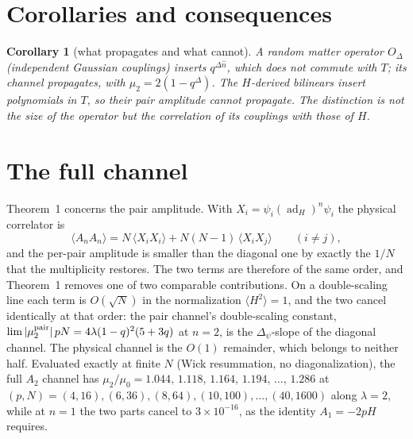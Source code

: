 \documentclass[11pt]{article}
\newtheorem{corollary}{Corollary}
\newcommand{\ad}{\operatorname{ad}}
\begin{document}
\section{Corollaries and consequences}

\begin{corollary}[what propagates and what cannot]
A random matter operator $O_\Delta$ (independent Gaussian couplings)
inserts $q^{\Delta\hat n}$, which does not commute with $T$; its channel
propagates, with $\mu_2=2(1-q^{\Delta})$. The $H$-derived bilinears insert
polynomials in $T$, so their pair amplitude cannot propagate. The
distinction is not the size of the operator but the correlation of its
couplings with those of $H$.
\end{corollary}

\section{The full channel}

Theorem~1 concerns the pair amplitude. With $X_i=\psi_i(\ad_H)^n\psi_i$
the physical correlator is
\begin{equation}
\langle A_nA_n\rangle=N\,\langle X_iX_i\rangle+N(N-1)\,\langle X_iX_j\rangle
\qquad(i\neq j),
\end{equation}
and the per-pair amplitude is smaller than the diagonal one by exactly
the $1/N$ that the multiplicity restores. The two terms are therefore of
the same order, and Theorem~1 removes one of two comparable
contributions. On a double-scaling line each term is $O(\sqrt N)$ in the
normalization $\langle H^2\rangle=1$, and the two cancel identically at
that order: the pair channel's double-scaling constant,
$\lim|\mu_2^{\rm pair}|\,pN=4\lambda(1-q)^2(5+3q)$ at $n=2$, is the
$\Delta_\psi$-slope of the diagonal channel. The physical channel is the
$O(1)$ remainder, which belongs to neither half. Evaluated exactly at
finite $N$ (Wick resummation, no diagonalization), the full $A_2$ channel
has $\mu_2/\mu_0=1.044,\,1.118,\,1.164,\,1.194,\,\dots,\,1.286$ at
$(p,N)=(4,16),(6,36),(8,64),(10,100),\dots,(40,1600)$ along
$\lambda=2$, while at $n=1$ the two parts cancel to $3\times10^{-16}$, as
the identity $A_1=-2pH$ requires.
\end{document}
